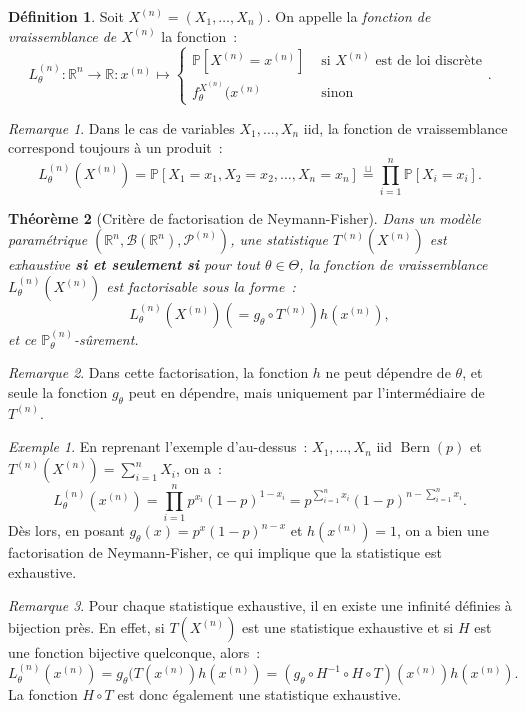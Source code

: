 \documentclass{report}
\DeclareMathOperator{\Bern}{Bern}  %
\renewcommand{\P}{\mathbb P}
\newcommand{\statmod}[4]{\left(#1^{#4}, #2\left(#1^{#4}\right), #3^{\left(#4\right)}\right)}
\newcommand{\R}{\mathbb R}
\newcommand{\Brl}{\mathcal B}  %
\newtheorem{thm}{Théorème}[chapter]
\theoremstyle{definition}
\newtheorem{déf}[thm]{Définition}
\theoremstyle{remark}
\newtheorem*{rmq}{Remarque}
\newtheorem{ex}{Exemple}[chapter]
\begin{document}
		\begin{déf} Soit $X^{(n)} = (X_1, \ldots, X_n)$. On appelle la \textit{fonction de vraissemblance de $X^{(n)}$} la fonction~:
		\[L_\theta^{(n)} : \R^n \to \R : x^{(n)} \mapsto \begin{cases}\P[X^{(n)} = x^{(n)}] &\text{ si $X^{(n)}$ est de loi discrète} \\f_\theta^{X^{(n)}}(x^{(n)} &\text{ sinon}\end{cases}.\]
		\end{déf}
		
		\begin{rmq} Dans le cas de variables $X_1, \ldots, X_n$ iid, la fonction de vraissemblance correspond toujours à un produit~:
		\[L_\theta^{(n)}(X^{(n)}) = \P[X_1 = x_1, X_2 = x_2, \ldots, X_n = x_n] \overset \sqcup= \prod_{i=1}^n\P[X_i = x_i].\]
		\end{rmq}
		
		\begin{thm}[Critère de factorisation de Neymann-Fisher] Dans un modèle paramétrique $\statmod \R\Brl{\mathcal P}n$, une statistique $T^{(n)}(X^{(n)})$ est
		exhaustive \textbf{si et seulement si} pour tout $\theta \in \Theta$, la fonction de vraissemblance $L_\theta^{(n)}(X^{(n)})$ est factorisable sous la forme~:
		\[L_\theta^{(n)}(X^{(n)}) \left(= g_\theta \circ T^{(n)}\right) h(x^{(n)}),\]
		et ce $\P_\theta^{(n)}$-sûrement.
		\end{thm}
		
		\begin{rmq} Dans cette factorisation, la fonction $h$ ne peut dépendre de $\theta$, et seule la fonction $g_\theta$ peut en dépendre, mais uniquement par
		l'intermédiaire de $T^{(n)}$.
		\end{rmq}
		
		\begin{ex} En reprenant l'exemple d'au-dessus~: $X_1, \ldots, X_n$ iid $\Bern(p)$ et $T^{(n)}(X^{(n)}) = \sum_{i=1}^nX_i$, on a~:
		\[L_\theta^{(n)}(x^{(n)}) = \prod_{i=1}^np^{x_i}(1-p)^{1-x_i} = p^{\sum_{i=1}^nx_i}(1-p)^{n - \sum_{i=1}^nx_i}.\]
		Dès lors, en posant $g_\theta(x) = p^x(1-p)^{n-x}$ et $h(x^{(n)}) = 1$, on a bien une factorisation de Neymann-Fisher, ce qui implique que la statistique
		est exhaustive.
		\end{ex}
		
		\begin{rmq} Pour chaque statistique exhaustive, il en existe une infinité définies à bijection près. En effet, si $T(X^{(n)})$ est une statistique exhaustive
		et si $H$ est une fonction bijective quelconque, alors~:
		\[L_\theta^{(n)}(x^{(n)}) = g_\theta(T(x^{(n)})h(x^{(n)}) = (g_\theta \circ H^{-1} \circ H \circ T)(x^{(n)})h(x^{(n)}).\]
		La fonction $H \circ T$ est donc également une statistique exhaustive. 
		\end{rmq}
		
\end{document}
